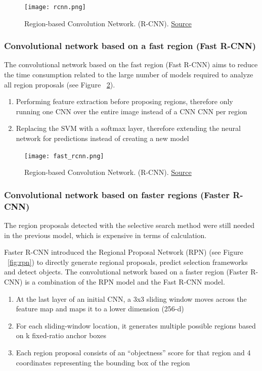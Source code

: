 \begin{figure}[H]
    \centering
    \texttt{[image: rcnn.png]}
	\caption[R-CNN]{Region-based Convolution Network. (R-CNN). \href{https://arxiv.org/pdf/1311.2524v5.pdf}{Source}}
	\label{fig:rcnn}
\end{figure}


\pagebreak\subsubsection{Convolutional network based on a fast region (Fast R-CNN)}
The convolutional network based on the fast region (Fast R-CNN)\cite{fastrcnn} aims to reduce the time consumption related to the large number of models required to analyze all region proposals (see Figure ~\ref{fig:fastrcnn}).
\begin{enumerate}
    \item Performing feature extraction before proposing regions, therefore only running one CNN over the entire image instead of a CNN CNN per region
    \item Replacing the SVM with a softmax layer, therefore extending the neural network for predictions instead of creating a new model
\end{enumerate}

\begin{figure}[H]
    \centering
    \texttt{[image: fast\_rcnn.png]}
	\caption[Fast R-CNN]{Region-based Convolution Network. (R-CNN). \href{https://arxiv.org/pdf/1504.08083.pdf}{Source}}
	\label{fig:fastrcnn}
\end{figure}

\pagebreak\subsubsection{Convolutional network based on faster regions (Faster R-CNN)}
The region proposals detected with the selective search method were still needed in the previous model, which is expensive in terms of calculation. 

Faster R-CNN\cite{fastrcnn} introduced the Regional Proposal Network (RPN) (see Figure ~\ref{fig:rpn}) to directly generate regional proposals, predict selection frameworks and detect objects. The convolutional network based on a faster region (Faster R-CNN) is a combination of the RPN model and the Fast R-CNN model.

\begin{enumerate}
    \item At the last layer of an initial CNN, a 3x3 sliding window moves across the feature map and maps it to a lower dimension (256-d)
    \item For each sliding-window location, it generates multiple possible regions based on k fixed-ratio anchor boxes
    \item Each region proposal consists of an “objectness” score for that region and 4 coordinates representing the bounding box of the region
\end{enumerate}


